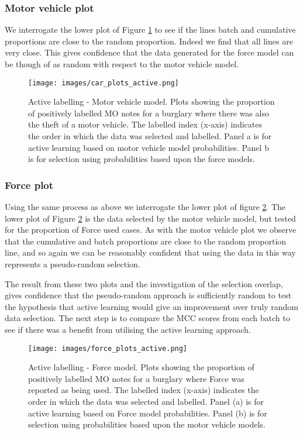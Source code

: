 \subsubsection{Motor vehicle plot}We interrogate the lower plot of Figure \ref{fig:active_car} to see if the lines batch and cumulative proportions are close to the random proportion. Indeed we find that all lines are very close. This gives confidence that the data generated for the force model can be though of as random with respect to the motor vehicle model. 

\begin{figure}[!ht]
  \centering
    \texttt{[image: images/car\_plots\_active.png]}
    \caption[Active labelling - Motor vehicle model. ]{{Active labelling - Motor vehicle model.} Plots showing the proportion of positively labelled MO notes for a burglary where there was also the theft of a motor vehicle. The labelled index (x-axis) indicates the order in which the data was selected and labelled. Panel a is for active learning based on motor vehicle model probabilities. Panel b is for selection using probabilities based upon the force models.}
    \label{fig:active_car}
\end{figure}


\subsubsection{Force plot} Using the same process as above we interrogate the lower plot of figure \ref{fig:active_force}. The lower plot of Figure \ref{fig:active_force} is the data selected by the motor vehicle model, but tested for the proportion of Force used cases. As with the motor vehicle plot we observe that the cumulative and batch proportions are close to the random proportion line, and so again we can be reasonably confident that using the data in this way represents a pseudo-random selection.

The result from these two plots and the investigation of the selection overlap, gives confidence that the pseudo-random approach is sufficiently random to test the hypothesis that active learning would give an improvement over truly random data selection. The next step is to compare the MCC scores from each batch to see if there was a benefit from utilising the active learning approach.



\begin{figure}[!ht]
  \centering
    \texttt{[image: images/force\_plots\_active.png]}
    \caption[Active labelling - Force model.]{{Active labelling - Force model.} Plots showing the proportion of positively labelled MO notes for a burglary where Force was reported as being used. The labelled index (x-axis) indicates the order in which the data was selected and labelled. Panel (a) is for active learning based on Force model probabilities. Panel (b) is for selection using probabilities based upon the motor vehicle models.}
    \label{fig:active_force}
\end{figure}


